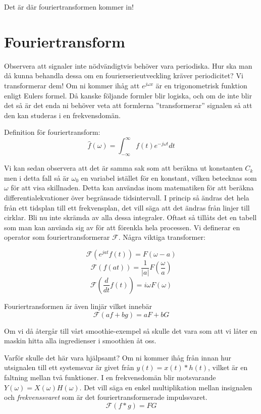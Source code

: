 \documentclass{article}
\begin{document}
Det är där fouriertransformen kommer in!

\section{Fouriertransform}

Observera att signaler inte nödvändigtvis behöver vara periodiska. Hur ska man då kunna behandla dessa om en fourierserieutveckling kräver periodicitet? Vi transformerar dem! Om ni kommer ihåg att $e^{j\omega x}$ är en trigonometrisk funktion enligt Eulers formel. Då kanske följande formler blir logiska, och om de inte blir det så är det enda ni behöver veta att formlerna ''transformerar'' signalen så att den kan studeras i en frekvensdomän.

Definition för fouriertransform:
\[\hat{f}(\omega) = \int_{-\infty}^{\infty} f(t) e^{-j \omega t} dt\]

Vi kan sedan observera att det är samma sak som att beräkna ut konstanten $C_k$ men i detta fall så är $\omega_0$ en variabel istället för en konstant, vilken betecknas som $\omega$ för att visa skillnaden.
Detta kan användas inom matematiken för att beräkna differentialekvationer över begränsade tidsintervall. I princip så ändras det hela från ett tidsplan till ett frekvensplan, det vill säga att det ändras från linjer till cirklar. %
Bli nu inte skrämda av alla dessa integraler. Oftast så tillåts det en tabell som man kan använda sig av för att förenkla hela processen. Vi definerar en operator som fouriertransformerar $\mathcal{F}$. Några viktiga transformer:

\[\mathcal{F}(e^{j a t} f(t)) = F(\omega - a)\]%
\[\mathcal{F}(f(at)) = \frac{1}{|a|}F(\frac{\omega}{a})\]%
\[\mathcal{F}(\frac{d}{dt} f(t)) = i\omega F(\omega) \]%

Fouriertransformen är även linjär vilket innebär
\[\mathcal{F}(a f + b g) = a F + b G\]

Om vi då återgår till vårt smoothie-exempel så skulle det vara som att vi låter en maskin hitta alla ingredienser i smoothien åt oss.

Varför skulle det här vara hjälpsamt? Om ni kommer ihåg från innan hur utsignalen till ett systemsvar är givet från $y(t) = x(t) * h(t)$, vilket är en faltning mellan två funktioner. I en frekvensdomän blir motsvarande $Y(\omega) = X(\omega) H(\omega)$. Det vill säga en enkel multiplikation mellan insignalen och \emph{frekvenssvaret} som är det fouriertransformerade impulssvaret.
\[\mathcal{F}(f*g) = F G \]
\end{document}
